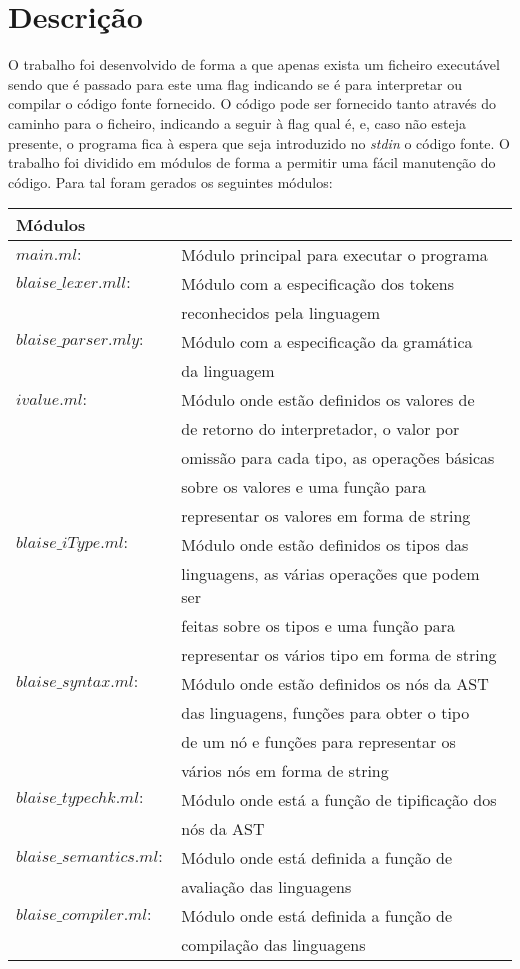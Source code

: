 \chapter{Descrição}

O trabalho foi desenvolvido de forma a que apenas exista um ficheiro executável 
sendo que é passado para este uma flag indicando se é para interpretar ou 
compilar o código fonte fornecido. O código pode ser fornecido tanto através do 
caminho para o ficheiro, indicando a seguir à flag qual é, e, caso não esteja 
presente, o programa fica à espera que seja introduzido no \emph{stdin} o 
código fonte. O trabalho foi dividido em módulos de forma a permitir uma fácil 
manutenção do código. 
Para tal foram gerados os seguintes módulos:

\begin{tabular}{|l|l|}
\hline
\multicolumn{2}{|l|}{\cellcolor{grey}Módulos}
\\
\hline
$main.ml:$				& Módulo principal para executar o programa 
\\
\hline
$blaise\_lexer.mll:$	& Módulo com a especificação dos tokens 
\\										& reconhecidos pela linguagem 
\\
\hline
$blaise\_parser.mly:$	& Módulo com a especificação da gramática 
\\										& da linguagem 
\\
\hline
$ivalue.ml:$			& Módulo onde estão definidos os valores de 
\\						& de retorno do interpretador, o valor por 
\\						& omissão para cada tipo, as operações básicas 
\\						& sobre os valores e uma função para 
\\						& representar os valores em forma de string 
\\
\hline
$blaise\_iType.ml:$		& Módulo onde estão definidos os tipos das 
\\						& linguagens, as várias operações que podem ser 
\\						& feitas sobre os tipos e uma função para 
\\						& representar os vários tipo em forma de string 
\\
\hline
$blaise\_syntax.ml:$ 	& Módulo onde estão definidos os nós da AST 
\\						& das linguagens, funções para obter o tipo 
\\						& de um nó e funções para representar os 
\\						& vários nós em forma de string 
\\
\hline
$blaise\_typechk.ml:$	& Módulo onde está a função de tipificação dos 
\\						& nós da AST 
\\
\hline
$blaise\_semantics.ml:$	& Módulo onde está definida a função de 
\\						& avaliação das linguagens 
\\ 
\hline
$blaise\_compiler.ml:$	& Módulo onde está definida a função de 
\\						& compilação das linguagens 
\\
\hline
\end{tabular}


